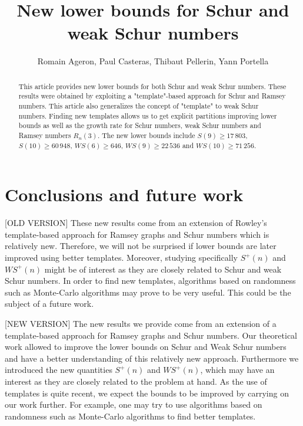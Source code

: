 \documentclass[3p]{elsarticle}
\title{New lower bounds for Schur and weak Schur numbers}
\author{Romain Ageron, Paul Casteras, Thibaut Pellerin, Yann Portella}
\newtheorem{computational theorem}[definition]{Computational Theorem}
\newcommand{\WS}{\mathit{WS}}
\begin{document}
\begin{abstract}

This article provides new lower bounds for both Schur and weak Schur numbers. These results were obtained by 
exploiting a "template"-based approach for Schur and Ramsey numbers. This article also generalizes the concept 
of "template" to weak Schur numbers. Finding new templates allows us to get explicit partitions improving lower bounds 
as well as the growth rate for Schur numbers, weak Schur numbers and Ramsey numbers \(R_n(3)\). The new lower 
bounds include \(S(9) \geqslant 17\,803\), \(S(10) \geqslant 60\,948\), \(\WS(6) \geqslant 646\), \(\WS (9) \geqslant 22\,536\) and 
\(\WS (10) \geqslant 71\,256 \).

\end{abstract}

\maketitle







\section{Conclusions and future work}

[OLD VERSION] These new results come from an extension of Rowley's template-based approach for Ramsey graphs and 
Schur numbers which is relatively new. Therefore, we will not be surprised if lower bounds are later improved 
using better templates. Moreover, studying specifically \(S^+(n)\) and \(\WS^+(n)\) might be of interest as they
 are closely related to Schur and weak Schur numbers. In order to find new templates, algorithms based on 
randomness such as Monte-Carlo algorithms may prove to be very useful. This could be the subject of a future work.

[NEW VERSION] The new results we provide come from an extension of a template-based approach for Ramsey graphs
and Schur numbers. Our theoretical work allowed to improve the lower bounds on Schur and Weak Schur numbers and have
a better understanding of this relatively new approach. Furthermore we introduced the new quantities \(S^+(n)\) and
\(\WS^+(n)\), which may have an interest as they are closely related to the problem at hand. As the use of templates
is quite recent, we expect the bounds to be improved by carrying on our work further. For example, one may try to use
algorithms based on randomness such as Monte-Carlo algorithms to find better templates.
\end{document}
